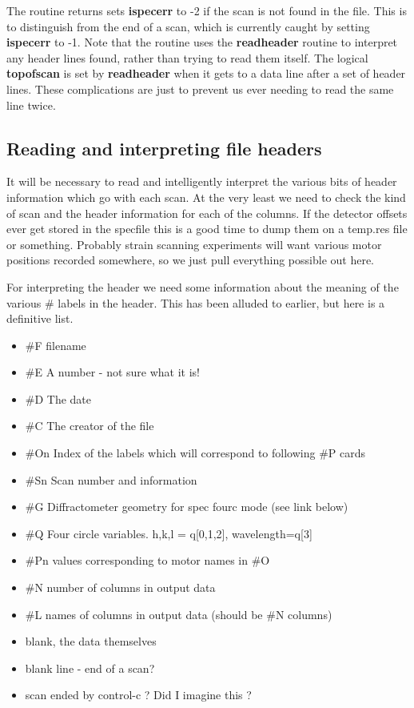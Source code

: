 \documentclass[10pt,a4paper,notitlepage]{article}
\newcommand{\var}[1]{\textbf{\textsf{#1}}} %
\newcommand{\code}[1]{\textbf{\textsf{#1}}} %
\begin{document}
The routine returns sets \var{ispecerr} to -2 if the scan is not
found in the file. 
This is to distinguish from the end of a scan, which is currently
caught by setting \var{ispecerr} to -1. 
Note that the routine uses the \code{readheader} routine to interpret 
any header lines found, rather than trying to read them itself.
The logical \var{topofscan} is set by \code{readheader} when it gets to 
a data line after a set of header lines. 
These complications are just to prevent us ever needing to read the
same line twice.


\subsection{Reading and interpreting file headers}
It will be necessary to read and intelligently interpret the various bits
of header information which go with each scan. 
At the very least we need to check the kind of scan and the header information
for each of the columns. 
If the detector offsets ever get stored in the specfile this is a 
good time to dump them on a temp.res file or something. 
Probably strain scanning experiments will want various motor positions 
recorded somewhere, so we just pull everything possible out here.

For interpreting the header we need some information about the meaning of the 
various \# labels in the header. This has been alluded to earlier, but here is
a definitive list.
\begin{itemize}
\item \#F filename
\item \#E A number - not sure what it is!
\item \#D The date
\item \#C The creator of the file
\item \#On Index of the labels which will correspond to following \#P cards
\item \#Sn Scan number and information
\item \#G Diffractometer geometry for spec fourc mode (see link below)
\item \#Q Four circle variables. h,k,l = q[0,1,2], wavelength=q[3]
\item \#Pn values corresponding to motor names in \#O
\item \#N number of columns in output data 
\item \#L names of columns in output data (should be \#N columns)
\item blank, the data themselves
\item blank line - end of a scan?
\item scan ended by control-c ? Did I imagine this ?
\end{itemize}
\end{document}
